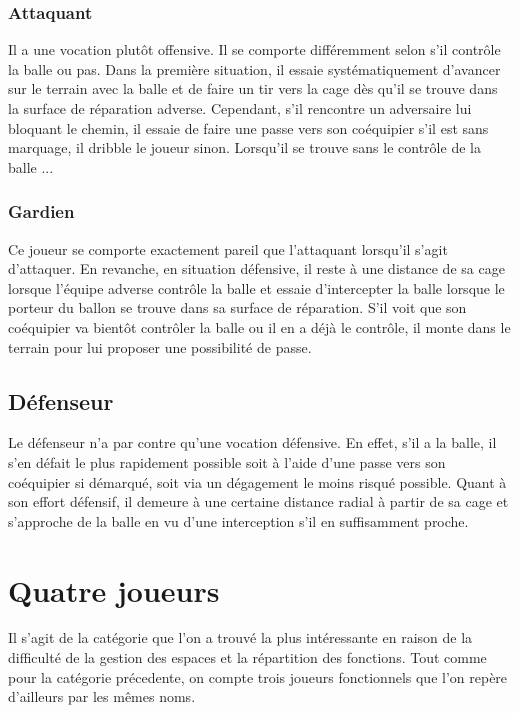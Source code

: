 \documentclass[12pt,a4paper]{article}
\begin{document}
\subsubsection*{Attaquant}
Il a une vocation plut\^ot offensive. Il se comporte diff\'eremment selon 
s'il contr\^ole la balle ou pas. Dans la premi\`ere situation, il essaie 
syst\'ematiquement d'avancer sur le terrain avec la balle et de faire un tir 
vers la cage d\`es qu'il se trouve dans la surface de r\'eparation adverse. 
Cependant, s'il rencontre un adversaire lui bloquant le chemin, il essaie de 
faire une passe vers son co\'equipier s'il est sans marquage, il dribble le 
joueur sinon. Lorsqu'il se trouve sans le contr\^ole de la balle ...

\subsubsection*{Gardien}
Ce joueur se comporte exactement pareil que l'attaquant lorsqu'il s'agit 
d'attaquer. En revanche, en situation d\'efensive, il reste \`a une 
distance de sa cage lorsque l'\'equipe adverse contr\^ole la balle et essaie 
d'intercepter la balle lorsque le porteur du ballon se trouve dans sa surface 
de r\'eparation. S'il voit que son co\'equipier va bient\^ot contr\^oler la 
balle ou il en a d\'ej\`a le contr\^ole, il monte dans le terrain pour lui 
proposer une possibilit\'e de passe.

\subsection*{D\'efenseur}
Le d\'efenseur n'a par contre qu'une vocation d\'efensive. En effet, s'il a la 
balle, il s'en d\'efait le plus rapidement possible soit \`a l'aide d'une passe 
vers son co\'equipier si d\'emarqu\'e, soit via un d\'egagement le moins 
risqu\'e possible. Quant \`a son effort d\'efensif, il demeure \`a une certaine 
distance radial \`a partir de sa cage et s'approche de la balle en vu d'une 
interception s'il en suffisamment proche.

\section*{Quatre joueurs}
Il s'agit de la cat\'egorie que l'on a trouv\'e la plus int\'eressante en 
raison de la difficult\'e de la gestion des espaces et la r\'epartition des 
fonctions. Tout comme pour la cat\'egorie pr\'ecedente, on compte trois 
joueurs fonctionnels que l'on rep\`ere d'ailleurs par les m\^emes noms. 
\end{document}
